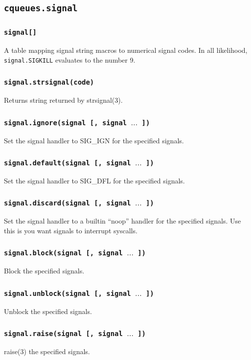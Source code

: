 \documentclass[11pt, oneside]{memoir}
\newcommand*{\fn}[1]{\texttt{#1}\xspace}
\newcounter{toccols}
\newenvironment{Module}[1]{
	\subsection{\texttt{#1}}
	\addtocontents{toc}{
		\protect\begin{multicols}{\value{toccols}}
	}
}{
	\addtocontents{toc}{\protect\end{multicols}}
}
\begin{document}
\begin{Module}{cqueues.signal}

\subsubsection{\fn{signal[]}}
A table mapping signal string macros to numerical signal codes.
In all likelihood, \texttt{signal.SIGKILL} evaluates to the number 9.

\subsubsection[\fn{signal.strsignal}]{\fn{signal.strsignal(code)}}
Returns string returned by strsignal(3).

\subsubsection[\fn{signal.ignore}]{\fn{signal.ignore(signal [, signal $\ldots $ ])}}
Set the signal handler to SIG\_IGN for the specified signals.

\subsubsection[\fn{signal.default}]{\fn{signal.default(signal [, signal $\ldots$ ])}}
Set the signal handler to SIG\_DFL for the specified signals.

\subsubsection[\fn{signal.discard}]{\fn{signal.discard(signal [, signal $\ldots$ ])}}
Set the signal handler to a builtin ``noop'' handler for the specified signals. Use this is you want signals to interrupt syscalls.

\subsubsection[\fn{signal.block}]{\fn{signal.block(signal [, signal $\ldots$ ])}}
Block the specified signals.

\subsubsection[\fn{signal.unblock}]{\fn{signal.unblock(signal [, signal $\ldots$ ])}}
Unblock the specified signals.

\subsubsection[\fn{signal.raise}]{\fn{signal.raise(signal [, signal $\ldots$ ])}}
raise(3) the specified signals.


\end{Module}
\end{document}
